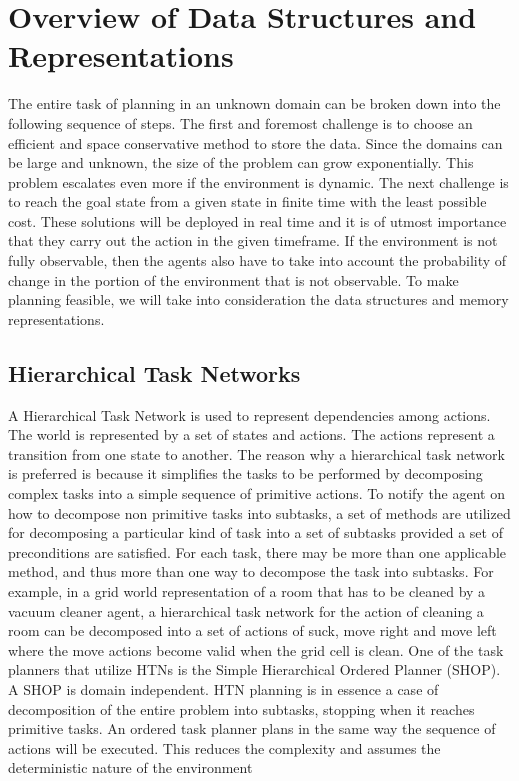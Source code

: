 \documentclass[tog]{acmsiggraph}
\begin{document}
\section{Overview of Data Structures and Representations}
The entire task of planning in an unknown domain can be broken down
into the following sequence of steps. The first and foremost challenge
is to choose an efficient and space conservative method to store the
data. Since the domains can be large and unknown, the size of the
problem can grow exponentially. This problem escalates even more if
the environment is dynamic. The next challenge is to reach the goal
state from a given state in finite time with the least possible cost.
These solutions will be deployed in real time and it is of utmost
importance that they carry out the action in the given timeframe. If
the environment is not fully observable, then the agents also have to
take into account the probability of change in the portion of the
environment that is not observable. To make planning feasible, we will
take into consideration the data structures and memory
representations.

\subsection{Hierarchical Task Networks}

A Hierarchical Task Network is used to represent dependencies among
actions. The world is represented by a set of states and actions. The
actions represent a transition from one state to another. The reason
why a hierarchical task network is preferred is because it simplifies
the tasks to be performed by decomposing complex tasks into a simple
sequence of primitive actions. To notify the agent on how to decompose
non primitive tasks into subtasks, a set of methods are utilized for
decomposing a particular kind of task into a set of subtasks provided
a set of preconditions are satisfied. \cite{erol1994htn} For each task, there may be more
than one applicable method, and thus more than one way to decompose
the task into subtasks. For example, in a grid
world representation of a room that has to be cleaned by a vacuum
cleaner agent, a hierarchical task network for the action of cleaning
a room can be decomposed into a set of actions of suck, move right and
move left where the move actions become valid when the grid cell is
clean. One of the task planners that utilize HTNs is the Simple
Hierarchical Ordered Planner (SHOP). A SHOP is domain independent. HTN
planning is in essence a case of decomposition of the entire problem
into subtasks, stopping when it reaches primitive tasks. \cite{nau1999shop} An ordered
task planner plans in the same way the sequence of actions will be
executed. This reduces the complexity and assumes the deterministic
nature of the environment
\end{document}
